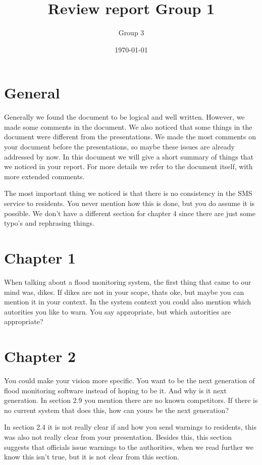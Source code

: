 \documentclass[a4paper,10pt]{article}
\author{Group 3}
\date{\today}
\title{Review report Group 1}
\begin{document}
\maketitle

\section{General}
Generally we found the document to be logical and well written. However, we made some comments in the document. We also noticed that some things in the document were different from the presentations. We made the most comments on your document before the presentations, so maybe these issues are already addressed by now. In this document we will give a short summary of things that we noticed in your report. For more details we refer to the document itself, with more extended comments. 

The most important thing we noticed is that there is no consistency in the SMS service to residents. You never mention how this is done, but you do assume it is possible. We don't have a different section for chapter 4 since there are just some typo's and rephrasing things. 

\section{Chapter 1}
When talking about a flood monitoring system, the first thing that came to our mind was, dikes. If dikes are not in your scope, thats oke, but maybe you can mention it in your context. In the system context you could also mention which autorities you like to warn. You say appropriate, but which autorities are appropriate?

\section{Chapter 2}
You could make your vision more specific. You want to be the next generation of flood monitoring software instead of hoping to be it. And why is it next generation. In section 2.9 you mention there are no known competitors. If there is no current system that does this, how can yours be the next generation? 

In section 2.4 it is not really clear if and how you send warnings to residents, this was also not really clear from your presentation. Besides this, this section suggests that officials issue warnings to the authorities, when we read further we know this isn't true, but it is not clear from this section.
\end{document}
